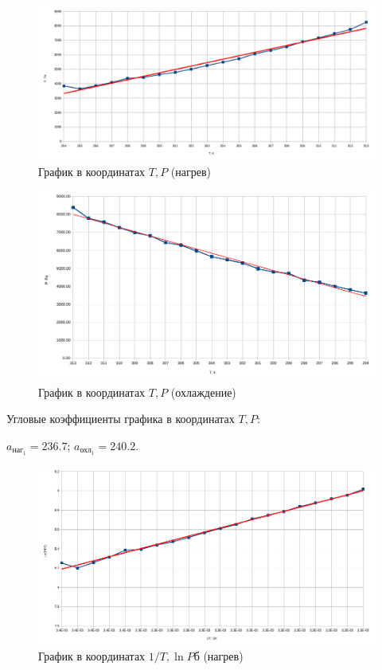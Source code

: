 \documentclass[a4paper, 12pt]{article}
\begin{document}
\begin{figure}[H]
	\caption{График в координатах $T, P$ (нагрев)}
	\center
	\includegraphics[scale=0.3]{chart1.png}
\end{figure}

\begin{figure}[H]
	\caption{График в координатах $T, P$ (охлаждение)}
	\center
	\includegraphics[scale=0.3]{chart2.png}
\end{figure}


Угловые коэффициенты графика в координатах $T, P$:

 $a_{\text{наг}_1} = 236.7$; $a_{\text{охл}_1} = 240.2$.
 \begin{figure}[H]
	\caption{График в координатах $1/T, \ln P$б (нагрев)}
	\center
	\includegraphics[scale=0.3]{chart3.png}
\end{figure}
\end{document}
